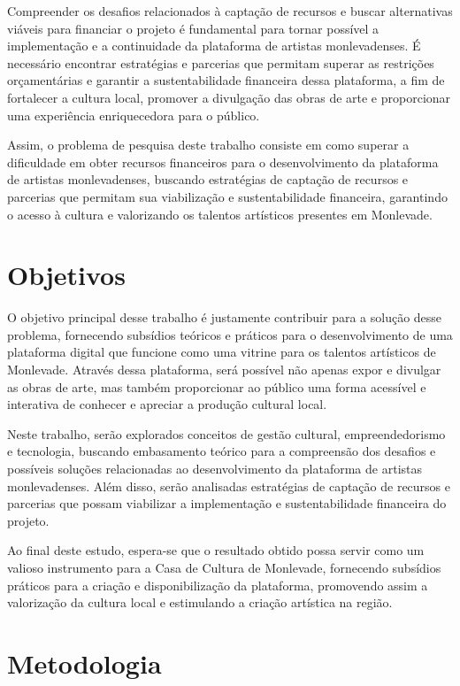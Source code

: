 Compreender os desafios relacionados à captação de recursos e buscar alternativas viáveis para financiar o projeto é fundamental para tornar possível a implementação e a continuidade da plataforma de artistas monlevadenses. É necessário encontrar estratégias e parcerias que permitam superar as restrições orçamentárias e garantir a sustentabilidade financeira dessa plataforma, a fim de fortalecer a cultura local, promover a divulgação das obras de arte e proporcionar uma experiência enriquecedora para o público.

Assim, o problema de pesquisa deste trabalho consiste em como superar a dificuldade em obter recursos financeiros para o desenvolvimento da plataforma de artistas monlevadenses, buscando estratégias de captação de recursos e parcerias que permitam sua viabilização e sustentabilidade financeira, garantindo o acesso à cultura e valorizando os talentos artísticos presentes em Monlevade.

\section{Objetivos}
\label{sec:objetivos}


O objetivo principal desse trabalho é justamente contribuir para a solução desse problema, fornecendo subsídios teóricos e práticos para o desenvolvimento de uma plataforma digital que funcione como uma vitrine para os talentos artísticos de Monlevade. Através dessa plataforma, será possível não apenas expor e divulgar as obras de arte, mas também proporcionar ao público uma forma acessível e interativa de conhecer e apreciar a produção cultural local.

Neste trabalho, serão explorados conceitos de gestão cultural, empreendedorismo e tecnologia, buscando embasamento teórico para a compreensão dos desafios e possíveis soluções relacionadas ao desenvolvimento da plataforma de artistas monlevadenses. Além disso, serão analisadas estratégias de captação de recursos e parcerias que possam viabilizar a implementação e sustentabilidade financeira do projeto.

Ao final deste estudo, espera-se que o resultado obtido possa servir como um valioso instrumento para a Casa de Cultura de Monlevade, fornecendo subsídios práticos para a criação e disponibilização da plataforma, promovendo assim a valorização da cultura local e estimulando a criação artística na região.

\section{Metodologia}
\label{sec:metodologia}

